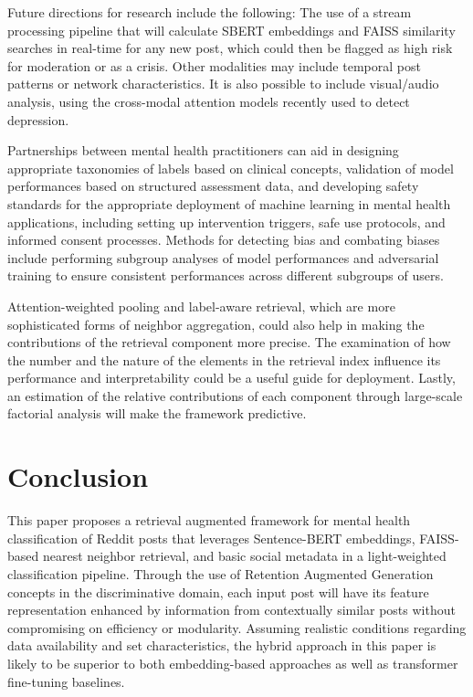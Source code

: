 \documentclass[11pt]{article}
\begin{document}
Future directions for research include the following: The use of a stream processing pipeline that will calculate SBERT embeddings and FAISS similarity searches in real-time for any new post, which could then be flagged as high risk for moderation or as a crisis. Other modalities may include temporal post patterns or network characteristics. It is also possible to include visual/audio analysis, using the cross-modal attention models recently used to detect depression.

Partnerships between mental health practitioners can aid in designing appropriate taxonomies of labels based on clinical concepts, validation of model performances based on structured assessment data, and developing safety standards for the appropriate deployment of machine learning in mental health applications, including setting up intervention triggers, safe use protocols, and informed consent processes. Methods for detecting bias and combating biases include performing subgroup analyses of model performances and adversarial training to ensure consistent performances across different subgroups of users.

Attention-weighted pooling and label-aware retrieval, which are more sophisticated forms of neighbor aggregation, could also help in making the contributions of the retrieval component more precise. The examination of how the number and the nature of the elements in the retrieval index influence its performance and interpretability could be a useful guide for deployment. Lastly, an estimation of the relative contributions of each component through large-scale factorial analysis will make the framework predictive.

\section{Conclusion}

This paper proposes a retrieval augmented framework for mental health classification of Reddit posts that leverages Sentence-BERT embeddings, FAISS-based nearest neighbor retrieval, and basic social metadata in a light-weighted classification pipeline. Through the use of Retention Augmented Generation concepts in the discriminative domain, each input post will have its feature representation enhanced by information from contextually similar posts without compromising on efficiency or modularity. Assuming realistic conditions regarding data availability and set characteristics, the hybrid approach in this paper is likely to be superior to both embedding-based approaches as well as transformer fine-tuning baselines.
\end{document}
